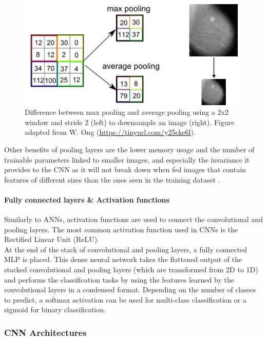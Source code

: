 \begin{figure}[ht]
\centerline{\includegraphics[width=\textwidth]{figures/litsurvey/max-vs-avg-pooling.png}}
\caption{\label{fig:litsurvey-max-vs-avg-pooling}Difference between max pooling and average pooling using a 2x2 window and stride 2 (left) to downsample an image (right). Figure adapted from W. Ong (\url{https://tinyurl.com/y25cke6l}).}
\end{figure}

Other benefits of pooling layers are the lower memory usage and the number of trainable parameters linked to smaller images, and especially the invariance it provides to the CNN as it will not break down when fed images that contain features of different sizes than the ones seen in the training dataset \citep{Shen2017}.

\paragraph{Fully connected layers \& Activation functions}

Similarly to ANNs, activation functions are used to connect the convolutional and pooling layers. The most common activation function used in CNNs is the Rectified Linear Unit (ReLU).\\

At the end of the stack of convolutional and pooling layers, a fully connected MLP is placed. This dense neural network takes the flattened output of the stacked convolutional and pooling layers (which are transformed from 2D to 1D) and performs the classification tasks by using the features learned by the convolutional layers in a condensed format. Depending on the number of classes to predict, a softmax activation can be used for multi-class classification or a sigmoid for binary classification.

\subsubsection{CNN Architectures}

